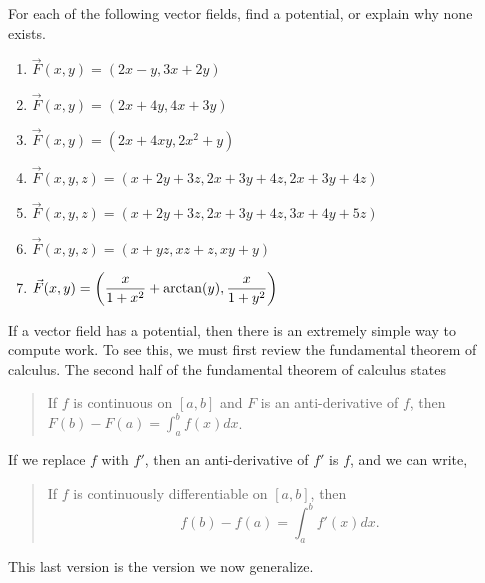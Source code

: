 \begin{problem}
%
For each of the following vector fields, find a potential, or explain why none exists.
\begin{enumerate}
 \item $\vec F(x,y)=(2x-y, 3x+2y)$
 \item $\vec F(x,y)=(2x+4y, 4x+3y)$
 \item $\vec F(x,y)=(2x+4xy, 2x^2+y)$
 \item $\vec F(x,y,z)=(x+2y+3z,2x+3y+4z,2x+3y+4z)$
 \item $\vec F(x,y,z)=(x+2y+3z,2x+3y+4z,3x+4y+5z)$
 \item $\vec F(x,y,z)=(x+yz,xz+z,xy+y)$
 \item $\displaystyle \vec F(x,y) = \left(\frac{x}{1+x^2}+\arctan (y),\frac{x}{1+y^2}\right)$
\end{enumerate}
\end{problem}


If a vector field has a potential, then there is an extremely simple way to compute work. To see this, we must first review the fundamental theorem of calculus. The second half of the fundamental theorem of calculus states
\begin{quote}
 If $f$ is continuous on $[a,b]$ and $F$ is an anti-derivative of $f$, then $F(b)-F(a) = \int_a^b f(x) dx$.
\end{quote}
If we replace $f$ with $f'$, then an anti-derivative of $f'$ is $f$, and we can write,
\begin{quote}
 If $f$ is continuously differentiable on $[a,b]$, then $$f(b)-f(a)=\int_a^b f'(x) dx.$$
\end{quote}
This last version is the version we now generalize.


